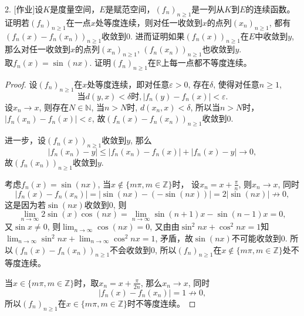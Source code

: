 \documentclass[a4paper,8pt]{ctexart}\textwidth 140mm \textheight 216mm
\newcommand{\e}{\varepsilon}
\newcommand{\8}{\infty}
\begin{document}
2. [作业]设$K$是度量空间，$E$是赋范空间，$(f_n)_{n\geq 1}$是一列从$K$到$E$的连续函数。证明若$(f_n)_{n\geq 1}$在一点$x$处等度连续，则对任一收敛到$x$的点列$(x_n)_{n\geq 1}$, 都有$(f_n(x)-f_n(x_n))_{n\geq 1}$收敛到0. 进而证明如果$(f_n(x))_{n\geq 1}$在$E$中收敛到$y$, 那么对任一收敛到$x$的点列$(x_n)_{n\geq 1}$, $(f_n(x_n))_{n\geq 1}$也收敛到$y$. \\
取$f_n(x)=\sin(nx)$. 证明$(f_n)_{n\geq 1}$在$\mathbb{R}$上每一点都不等度连续。
\begin{proof}
	设$(f_n)_{n\geq 1}$在$x$处等度连续，即对任意$\e>0$, 存在$\delta$, 使得对任意$n\geq 1$, 
	\[\mbox{当} d(y,x)<\delta \mbox{时}, |f_n(y)-f_n(x)|<\e.\]
	设$x_n\to x$, 则存在$N\in\mathbb{N}$, 当$n>N$时, $d(x_n,x)<\delta$, 所以当$n>N$时，$|f_n(x_n)-f_n(x)|<\e$, 故$(f_n(x)-f_n(x_n))_{n\geq 1}$收敛到0.
	
	进一步，设$(f_n(x))_{n\geq 1}$收敛到$y$, 那么
	$$|f_n(x_n)-y|\leq |f_n(x_n)-f_n(x)|+|f_n(x)-y|\to 0,$$
	故$(f_n(x_n))_{n\geq 1}$收敛到$y$.
	
	考虑$f_n(x)=\sin(nx)$, 当$x\notin\{m\pi, m\in\mathbb{Z}\}$时， 设$x_n=x+\frac{\pi}{n}$, 则$x_n\to x$, 同时
	$$|f_n(x)-f_n(x_n)|=|\sin(nx)-(-\sin(nx))|=2|\sin (nx)|\nrightarrow0,$$
	这是因为若$\sin(nx)$收敛到$0$, 则
	\[\lim_{n\to\infty} 2\sin(x)\cos(nx)=\lim_{n\to\infty}\sin(n+1)x-\sin(n-1)x=0,\]
	又$\sin x\ne 0$, 则$\lim_{n\to\infty}\cos(nx)=0$, 又由由$\sin^2 nx+\cos^2 nx=1$知$\lim_{n\to\infty}\sin^2 nx+\lim_{n\to\infty}\cos^2 nx=1$, 矛盾，故$\sin(nx)$不可能收敛到$0$.
	所以$(f_n(x)-f_n(x_n))_{n\geq 1}$不会收敛到0, 所以$(f_n)_{n\geq 1}$在$x\notin\{m\pi, m\in\mathbb{Z}\}$处不等度连续。
	
	当$x\in\{m\pi, m\in\mathbb{Z}\}$时，取$x_n=x+\frac{\pi}{2n}$, 那么$x_n\to x$, 同时
	$$|f_n(x)-f_n(x_n)|=1\nrightarrow0,$$
	所以$(f_n)_{n\geq 1}$在$x\in\{m\pi, m\in\mathbb{Z}\}$时不等度连续。
\end{proof}
\end{document}
